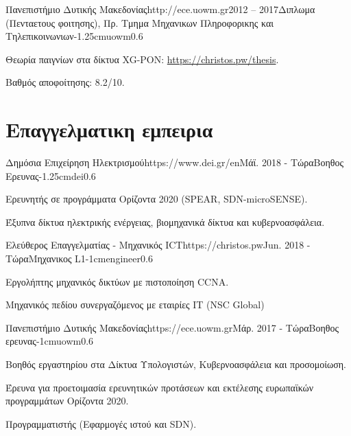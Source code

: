 \documentclass{mycv}
\begin{document}
	\begin{EntryDatedLogo}{Πανεπιστήμιο Δυτικής Μακεδονίας}{http://ece.uowm.gr}{2012 -- 2017}{Διπλωμα (Πενταετους φοιτησης), Πρ. Τμημα Μηχανικων Πληροφορικης και Τηλεπικοινωνιων}{-1.25cm}{uowm}{0.6}
		\begin{Itemize}
			\item Θεωρία παιγνίων στα δίκτυα XG-PON: \url{https://christos.pw/thesis}.
			\item Βαθμός αποφοίτησης: 8.2/10.
		\end{Itemize}
	\end{EntryDatedLogo}
	
	\section{Επαγγελματικη εμπειρια}
	\begin{EntryDatedLogo}{Δημόσια Επιχείρηση Ηλεκτρισμού}{https://www.dei.gr/en}{Μάϊ. 2018 - Τώρα}{Βοηθος Ερευνας}{-1.25cm}{dei}{0.6}
	\begin{Itemize}
		\item Ερευνητής σε προγράμματα Ορίζοντα 2020 (SPEAR, SDN-microSENSE).
		\item Έξυπνα δίκτυα ηλεκτρικής ενέργειας, βιομηχανικά δίκτυα και κυβερνοασφάλεια.
	\end{Itemize}
	\end{EntryDatedLogo}

	\vspace*{0.5cm}

	\begin{EntryDatedLogo}{Ελεύθερος Επαγγελματίας - Μηχανικός ICT}{https://christos.pw}{Jun. 2018 - Τώρα}{Μηχανικος L1}{-1cm}{engineer}{0.6}
		\begin{Itemize}
			\item Εργολήπτης μηχανικός δικτύων με πιστοποίηση CCNA.
			\item Μηχανικός πεδίου συνεργαζόμενος με εταιρίες IT (NSC Global)
		\end{Itemize}
	\end{EntryDatedLogo}

	\vspace*{0.5cm}	

	\begin{EntryDatedLogo}{Πανεπιστήμιο Δυτικής Μακεδονίας}{https://ece.uowm.gr}{Μάρ. 2017 - Τώρα}{Βοηθος ερευνας}{-1cm}{uowm}{0.6}
		\begin{Itemize}
			\item Βοηθός εργαστηρίου στα Δίκτυα Υπολογιστών, Κυβερνοασφάλεια και προσομοίωση.
			\item Έρευνα για προετοιμασία ερευνητικών προτάσεων και εκτέλεσης ευρωπαϊκών προγραμμάτων Ορίζοντα 2020.
			\item Προγραμματιστής (Εφαρμογές ιστού και SDN).
		\end{Itemize}
	\end{EntryDatedLogo}
	
\end{document}
